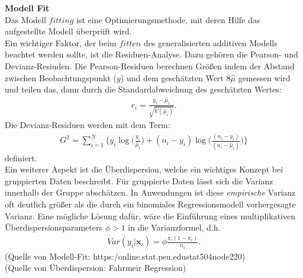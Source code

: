\documentclass[12pt]{scrreprt}
\begin{document}
\textbf{Modell Fit} \\
Das Modell $fitting$ ist eine Optimierungsmethode, mit deren Hilfe das aufgestellte Modell überprüft wird.\\ 
Ein wichtiger Faktor, der beim $fitten$ des generalisierten additiven Modells beachtet werden sollte, ist die Residuen-Analyse. Dazu gehören die Pearson- und Devianz-Resiuden. Die Pearson-Residuen berechnen Größen indem der Abstand zwischen Beobachtungspunkt ($y$) und dem geschätzten Wert 8$\hat\mu$ gemessen wird und teilen das, dann durch die Standardabweichung des geschätzten Wertes:
\begin{align}
r_{i}=\frac{y_{i}-\hat\mu_{i}}{\sqrt{\hat V(\hat\mu_{i})}}.
\end{align}
Die Devianz-Residuen werden mit dem Term:
\begin{align}
G^2=\sum_{i=1}^N\bigg\{y_{i}\log\bigg(\frac{y_{i}}{\hat\mu_{i}}\bigg)+(n_{i}-y_{i})\log\bigg(\frac{(n_{i}-y_{i})}{(n_{i}-\hat\mu_{i})}\bigg) \bigg\}
\end{align}
definiert. \\
Ein weiterer Aspekt ist die Überdispersion, welche ein wichtiges Konzept bei gruppierten Daten beschreibt. Für gruppierte Daten lässt sich die Varianz innerhalb der Gruppe abschätzen. In Anwendungen ist diese \textit{empirische} Varianz oft deutlich größer als die durch ein binomiales Regressionsmodell vorhergesagte Varianz. Eine mögliche Lösung dafür, wäre die Einführung eines multiplikativen Überdispersionsparameters $\phi > 1$ in die Varianzformel, d.h.
\begin{align}
Var(y_{i}|\textbf{x}_{i})=\phi \frac{\pi_{i}(1-\pi_{i})}{n_{i}}.
\end{align}
(Quelle von Modell-Fit: https:\//online.stat.psu.edu\/stat504\/node\/220\/) \\
(Quelle von Überdispersion: Fahrmeir Regression)
\end{document}
